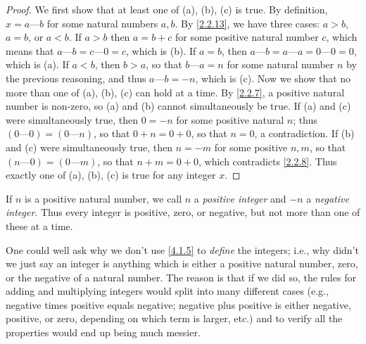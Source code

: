 \begin{proof}
  We first show that at least one of (a), (b), (c) is true.
  By definition, \(x = a \text{---} b\) for some natural numbers \(a, b\).
  By \cref{2.2.13}, we have three cases: \(a > b\), \(a = b\), or \(a < b\).
  If \(a > b\) then \(a = b + c\) for some positive natural number \(c\), which means that \(a \text{---} b = c \text{---} 0 = c\), which is (b).
  If \(a = b\), then \(a \text{---} b = a \text{---} a = 0 \text{---} 0 = 0\), which is (a).
  If \(a < b\), then \(b > a\), so that \(b \text{---} a = n\) for some natural number \(n\) by the previous reasoning, and thus \(a \text{---} b = -n\), which is (c).
  Now we show that no more than one of (a), (b), (c) can hold at a time.
  By \cref{2.2.7}, a positive natural number is non-zero, so (a) and (b) cannot simultaneously be true.
  If (a) and (c) were simultaneously true, then \(0 = -n\) for some positive natural \(n\);
  thus \((0 \text{---} 0) = (0 \text{---} n)\), so that \(0 + n = 0 + 0\), so that \(n = 0\), a contradiction.
  If (b) and (c) were simultaneously true, then \(n = -m\) for some positive \(n, m\), so that \((n \text{---} 0) = (0 \text{---} m)\), so that \(n + m = 0 + 0\), which contradicts \cref{2.2.8}.
  Thus exactly one of (a), (b), (c) is true for any integer \(x\).
\end{proof}

\begin{note}
  If \(n\) is a positive natural number, we call \(n\) a \emph{positive integer} and \(-n\) a \emph{negative integer}.
  Thus every integer is positive, zero, or negative, but not more than one of these at a time.
\end{note}

\begin{note}
  One could well ask why we don't use \cref{4.1.5} to \emph{define} the integers;
  i.e., why didn't we just say an integer is anything which is either a positive natural number, zero, or the negative of a natural number.
  The reason is that if we did so, the rules for adding and multiplying integers would split into many different cases (e.g., negative times positive equals negative; negative plus positive is either negative, positive, or zero, depending on which term is larger, etc.) and to verify all the properties would end up being much messier.
\end{note}

